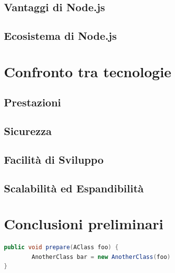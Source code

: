 \subsection{Vantaggi di Node.js}
\subsection{Ecosistema di Node.js}

\newpage
\section{Confronto tra tecnologie}
\label{sec:Confronto}
\subsection{Prestazioni}
\subsection{Sicurezza}
\subsection{Facilità di Sviluppo}
\subsection{Scalabilità ed Espandibilità}

\newpage
\section{Conclusioni preliminari}
\label{sec:ConclusioniTecnologie}

\newpage


\begin{lstlisting}[language=Java, label=lst:java, caption={Some code in another language than the default one}]
public void prepare(AClass foo) {
        AnotherClass bar = new AnotherClass(foo)
}
\end{lstlisting}
